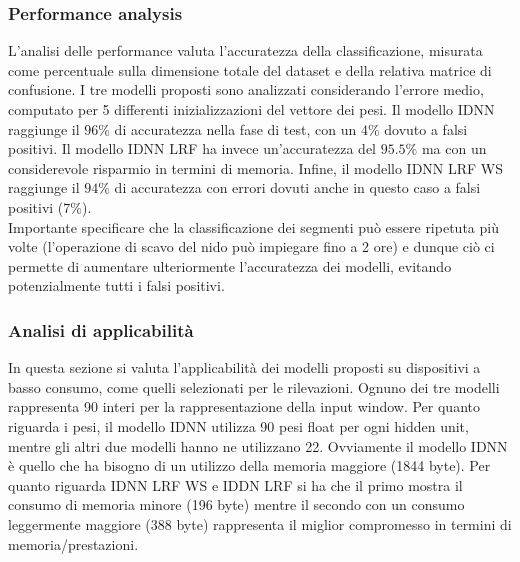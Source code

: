 \documentclass[12pt]{article}
\begin{document}
 			\subsubsection{Performance analysis}
 				L'analisi delle performance valuta l'accuratezza della classificazione, misurata come percentuale sulla dimensione totale del dataset e della relativa matrice di confusione. I tre modelli proposti sono analizzati considerando l'errore medio, computato per 5 differenti inizializzazioni del vettore dei pesi.
 				Il modello IDNN raggiunge il $96\%$ di accuratezza nella fase di test, con un $4\%$ dovuto a falsi positivi. Il modello IDNN LRF ha invece un'accuratezza del $95.5\%$ ma con un considerevole risparmio in termini di memoria. Infine, il modello IDNN LRF WS raggiunge il $94\%$ di accuratezza con errori dovuti anche in questo caso a falsi positivi ($7\%$).\\
 				Importante specificare che la classificazione dei segmenti può essere ripetuta più volte (l'operazione di scavo del nido può impiegare fino a 2 ore) e dunque ciò ci permette di aumentare ulteriormente l'accuratezza dei modelli, evitando potenzialmente tutti i falsi positivi.
 			\subsubsection{Analisi di applicabilità}
 				In questa sezione si valuta l'applicabilità dei modelli proposti su dispositivi a basso consumo, come quelli selezionati per le rilevazioni. Ognuno dei tre modelli rappresenta 90 interi per la rappresentazione della input window. Per quanto riguarda i pesi, il modello IDNN utilizza 90 pesi float per ogni hidden unit, mentre gli altri due modelli hanno ne utilizzano 22. Ovviamente il modello IDNN è quello che ha bisogno di un utilizzo della memoria maggiore (1844 byte). Per quanto riguarda IDNN LRF WS e IDDN LRF si ha che il primo mostra il consumo di memoria minore (196 byte) mentre il secondo con un consumo leggermente maggiore (388 byte) rappresenta il miglior compromesso in termini di memoria/prestazioni.
\end{document}

